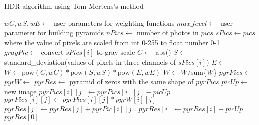 \begin{algorithm}
\caption{HDR algorithm using Tom Mertens's method \cite{ref:mertens}}
\begin{algorithmic}[1]
\State $wC, wS, wE\gets$ user parameters for weighting functions
\State $max\_level\gets$ user parameter for building pyramids
  \State $nPics\gets$ number of photos in $pics$
  \State $sPics\gets pics$ where the value of pixels are scaled from int 0-255 to float number 0-1
    \State $grayPic\gets$ convert $sPics[i]$ to gray scale 
    \State $C\gets$ abs()
    \State $S\gets$ standard\_deviation(values of pixels in three channels of $sPics[i]$)
    \State $E\gets$ 
    \State $W\gets \mbox{pow}(C, wC) *\mbox{pow}(S, wS) *\mbox{pow}(E, wE)$
  \EndFor
  \State $W\gets W/$sum\{$W$\}
  \State $pyrPics\gets$ 
  \State $pyrW\gets$ 
  \State $pyrRes\gets$ pyramid of zeros with the same shape of $pyrPics$
  \State $picUp\gets$ new image
      \State {}
      \State $pyrPics[i][j]\gets pyrPics[i][j]-picUp$
    \EndFor
      \State $pyrPics[i][j]\gets pyrPics[i][j]*pyrW[i][j]$
      \State $pyrRes[j]\gets pyrRes[j]+pyrPic[i][j]$ 
    \EndFor
  \EndFor
    \State {}
    \State $pyrRes[i]\gets pyrRes[i]+picUp$
  \EndFor
  \State \Return $pyrRes[0]$
\EndFunction
\end{algorithmic}
\end{algorithm}

